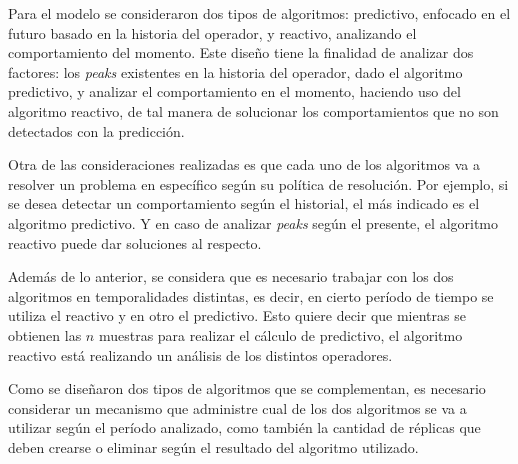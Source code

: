 Para el modelo se consideraron dos tipos de algoritmos: predictivo, enfocado en el futuro basado en la historia del operador, y reactivo, analizando el comportamiento del momento. Este dise\~no tiene la finalidad de analizar dos factores: los \textit{peaks} existentes en la historia del operador, dado el algoritmo predictivo, y analizar el comportamiento en el momento, haciendo uso del algoritmo reactivo, de tal manera de solucionar los comportamientos que no son detectados con la predicci\'on.


\normalsize{Otra de las consideraciones realizadas es que cada uno de los algoritmos va a resolver un problema en espec\'ifico seg\'un su pol\'itica de resoluci\'on. Por ejemplo, si se desea detectar un comportamiento seg\'un el historial, el m\'as indicado es el algoritmo predictivo. Y en caso de analizar \textit{peaks} seg\'un el presente, el algoritmo reactivo puede dar soluciones al respecto.}

Adem\'as de lo anterior, se considera que es necesario trabajar con los dos algoritmos en temporalidades distintas, es decir, en cierto per\'iodo de tiempo se utiliza el reactivo y en otro el predictivo. Esto quiere decir que mientras se obtienen las $n$ muestras para realizar el c\'alculo de predictivo, el algoritmo reactivo est\'a realizando un an\'alisis de los distintos operadores.


Como se dise\~naron dos tipos de algoritmos que se complementan, es necesario considerar un mecanismo que administre cual de los dos algoritmos se va a utilizar seg\'un el per\'iodo analizado, como tambi\'en la cantidad de r\'eplicas que deben crearse o eliminar seg\'un el resultado del algoritmo utilizado.


